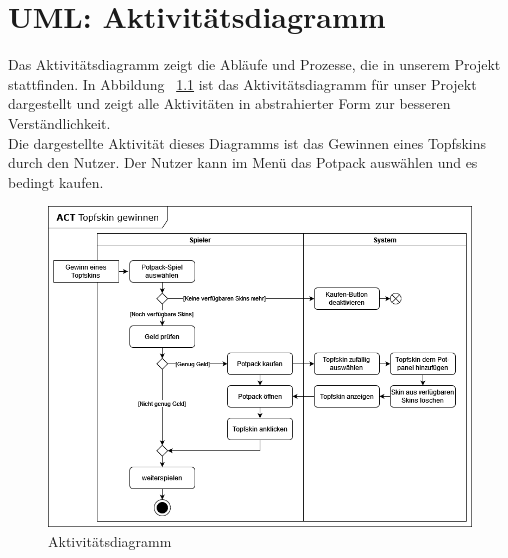 \chapter{UML: Aktivitätsdiagramm}\label{ch:uml_act}
Das Aktivitätsdiagramm zeigt die Abläufe und Prozesse, die in unserem Projekt stattfinden.
In Abbildung ~\ref{fig:act} ist das Aktivitätsdiagramm für unser Projekt dargestellt und zeigt alle Aktivitäten in 
abstrahierter Form zur besseren Verständlichkeit. \\
\newline
Die dargestellte Aktivität dieses Diagramms ist das Gewinnen eines Topfskins durch den Nutzer.
Der Nutzer kann im Menü das Potpack auswählen und es bedingt kaufen.


\vspace{1cm}
\begin{figure}[h]
    \centering
    \includegraphics[width=\linewidth]{../bilder/act_potpack}
    \vspace{0.05cm}
    \caption{Aktivitätsdiagramm}
    \label{fig:act}
\end{figure}